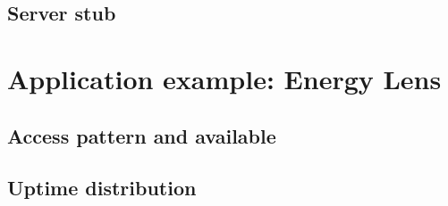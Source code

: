 \subsection{Server stub}

\section{Application example: Energy Lens}

\subsection {Access pattern and available}

\subsection {Uptime distribution}



